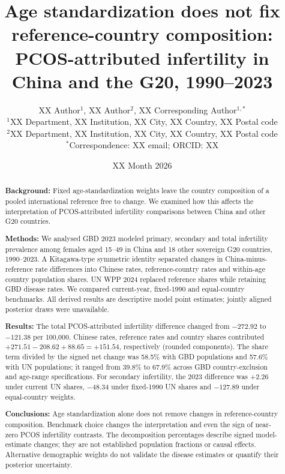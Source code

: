 \documentclass[11pt,a4paper]{article}
\title{Age standardization does not fix reference-country composition: PCOS-attributed infertility in China and the G20, 1990--2023}
\author{XX Author$^{1}$, XX Author$^{2}$, XX Corresponding Author$^{1,*}$\\
{\small $^{1}$XX Department, XX Institution, XX City, XX Country, XX Postal code}\\
{\small $^{2}$XX Department, XX Institution, XX City, XX Country, XX Postal code}\\
{\small $^{*}$Correspondence: XX email; ORCID: XX}}
\date{XX Month 2026}
\begin{document}
\maketitle
\linenumbers
\begin{abstract}
\noindent\textbf{Background:} Fixed age-standardization weights leave the country composition of a pooled international reference free to change. We examined how this affects the interpretation of PCOS-attributed infertility comparisons between China and other G20 countries.

\noindent\textbf{Methods:} We analysed GBD 2023 modeled primary, secondary and total infertility prevalence among females aged 15--49 in China and 18 other sovereign G20 countries, 1990--2023. A Kitagawa-type symmetric identity separated changes in China-minus-reference rate differences into Chinese rates, reference-country rates and within-age country population shares. UN WPP 2024 replaced reference shares while retaining GBD disease rates. We compared current-year, fixed-1990 and equal-country benchmarks. All derived results are descriptive model point estimates; jointly aligned posterior draws were unavailable.

\noindent\textbf{Results:} The total PCOS-attributed infertility difference changed from $-272.92$ to $-121.38$ per 100,000. Chinese rates, reference rates and country shares contributed $+271.51-208.62+88.65=+151.54$, respectively (rounded components). The share term divided by the signed net change was 58.5\% with GBD populations and 57.6\% with UN populations; it ranged from 39.8\% to 67.9\% across GBD country-exclusion and age-range specifications. For secondary infertility, the 2023 difference was +2.26 under current UN shares, $-48.34$ under fixed-1990 UN shares and $-127.89$ under equal-country weights.

\noindent\textbf{Conclusions:} Age standardization alone does not remove changes in reference-country composition. Benchmark choice changes the interpretation and even the sign of near-zero PCOS infertility contrasts. The decomposition percentages describe signed model-estimate changes; they are not established population fractions or causal effects. Alternative demographic weights do not validate the disease estimates or quantify their posterior uncertainty.
\end{abstract}
\end{document}
